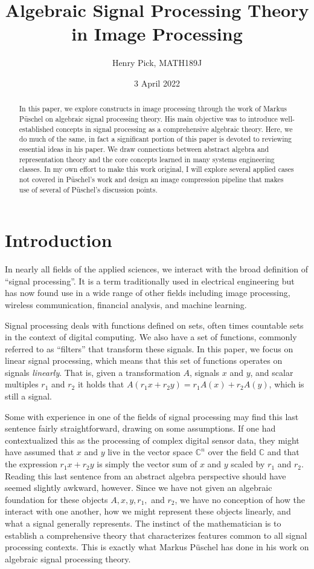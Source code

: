 \documentclass[12pt,technote]{IEEEtran}
\author{Henry Pick, MATH189J}
\title{Algebraic Signal Processing Theory in Image Processing}
\date{3 April 2022}
\begin{document}
\maketitle
\begin{abstract}
    In this paper, we explore constructs in image processing through the work of Markus P\"uschel on algebraic signal processing theory. His main objective was to introduce well-established concepts in signal processing as a comprehensive algebraic theory. Here, we do much of the same, in fact a significant portion of this paper is devoted to reviewing essential ideas in his paper. We draw connections between abstract algebra and representation theory and the core concepts learned in many systems engineering classes. In my own effort to make this work original, I will explore several applied cases not covered in P\"uschel's work and design an image compression pipeline that makes use of several of P\"uschel's discussion points.
\end{abstract}
\section{Introduction}
In nearly all fields of the applied sciences, we interact with the broad definition of ``signal processing''. It is a term traditionally used in electrical engineering but has now found use in a wide range of other fields including image processing, wireless communication, financial analysis, and machine learning.

Signal processing deals with functions defined on sets, often times countable sets in the context of digital computing. We also have a set of functions, commonly referred to as ``filters'' that transform these signals. In this paper, we focus on linear signal processing, which means that this set of functions operates on signals \textit{linearly}. That is, given a transformation $A$, signals $x$ and $y$, and scalar multiples $r_1$ and $r_2$ it holds that $A(r_1x + r_2y) = r_1A(x) + r_2A(y)$, which is still a signal.

Some with experience in one of the fields of signal processing may find this last sentence fairly straightforward, drawing on some assumptions. If one had contextualized this as the processing of complex digital sensor data, they might have assumed that $x$ and $y$ live in the vector space $\mathbb{C}^n$ over the field $\mathbb{C}$ and that the expression $r_1x + r_2y$ is simply the vector sum of $x$ and $y$ scaled by $r_1$ and $r_2$. Reading this last sentence from an abstract algebra perspective should have seemed slightly awkward, however. Since we have not given an algebraic foundation for these objects $A, x, y, r_1,$ and $r_2$, we have no conception of how the interact with one another, how we might represent these objects linearly, and what a signal generally represents. The instinct of the mathematician is to establish a comprehensive theory that characterizes features common to all signal processing contexts. This is exactly what Markus P\"uschel has done in his work on algebraic signal processing theory\cite{AlgebraicSignalProcessing2006}.
\end{document}
